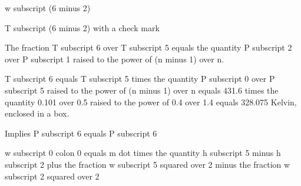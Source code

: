 w subscript (6 minus 2)

T subscript (6 minus 2) with a check mark

The fraction T subscript 6 over T subscript 5 equals the quantity P subscript 2 over P subscript 1 raised to the power of (n minus 1) over n.

T subscript 6 equals T subscript 5 times the quantity P subscript 0 over P subscript 5 raised to the power of (n minus 1) over n equals 431.6 times the quantity 0.101 over 0.5 raised to the power of 0.4 over 1.4 equals 328.075 Kelvin, enclosed in a box.

Implies P subscript 6 equals P subscript 6

w subscript 0 colon 0 equals m dot times the quantity h subscript 5 minus h subscript 2 plus the fraction w subscript 5 squared over 2 minus the fraction w subscript 2 squared over 2